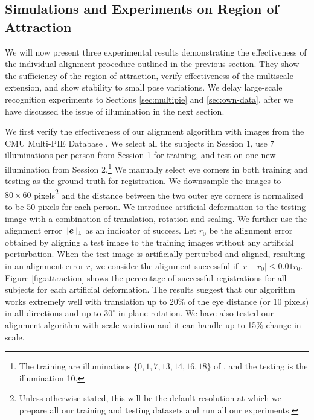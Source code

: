 \documentclass[12pt,journal,draftcls,letterpaper,onecolumn]{IEEEtran}
\begin{document}
\subsection{Simulations and Experiments on Region of
Attraction} We will now present three experimental results
demonstrating the effectiveness of the individual alignment
procedure outlined in the previous section. They show the sufficiency of the
region of attraction, verify effectiveness of the multiscale extension,
and show stability to small pose variations.  We delay large-scale recognition experiments
to Sections \ref{sec:multipie} and \ref{sec:own-data}, after we
have discussed the issue of illumination in the next section.

  We first verify the
    effectiveness of our alignment algorithm with images
    from the CMU Multi-PIE Database \cite{Gross2008-FGR}.
    We select all the subjects in Session 1, use 7
    illuminations per person from Session 1 for training,
    and test on one new illumination from Session
    2.\footnote{The training are illuminations $\{0, 1, 7,
    13, 14, 16, 18\}$ of \cite{Gross2008-FGR}, and the
    testing is the illumination 10. } We manually select
    eye corners in both training and testing as the ground
    truth for registration. We downsample the images to
    $80\times 60$ pixels\footnote{Unless otherwise stated,
    this will be the default resolution at which we prepare
    all our training and testing datasets and run all our
    experiments.} and the distance between the two outer
    eye corners is normalized to be 50 pixels for each
    person. We introduce artificial deformation to the
    testing image with a combination of translation,
    rotation and scaling. We further use the alignment
    error $\|\boldsymbol{e}\|_1$ as an indicator of success. Let $r_0$
    be the alignment error obtained by aligning a test
    image to the training images without any artificial
    perturbation. When the test image is artificially
    perturbed and aligned, resulting in an alignment error
    $r$, we consider the alignment successful if $|r - r_0 | \leq
    0.01r_0$. Figure \ref{fig:attraction} shows the
    percentage of successful registrations for all subjects
    for each artificial deformation. The results suggest
    that our algorithm works extremely well with
    translation up to 20\% of the eye distance (or 10
    pixels) in all directions and up to $30^\circ$ in-plane
    rotation. We have also tested our alignment algorithm
    with scale variation and it can handle up to 15\%
    change in scale.
\end{document}
